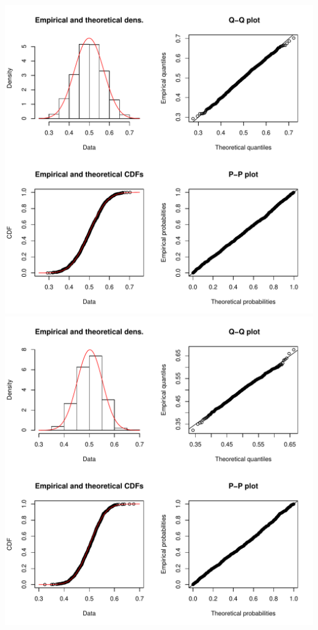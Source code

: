 \documentclass[]{article}
\begin{document}
\includegraphics{2016_w09_files/figure-latex/unnamed-chunk-9-8.pdf}
\includegraphics{2016_w09_files/figure-latex/unnamed-chunk-9-9.pdf}
\end{document}
